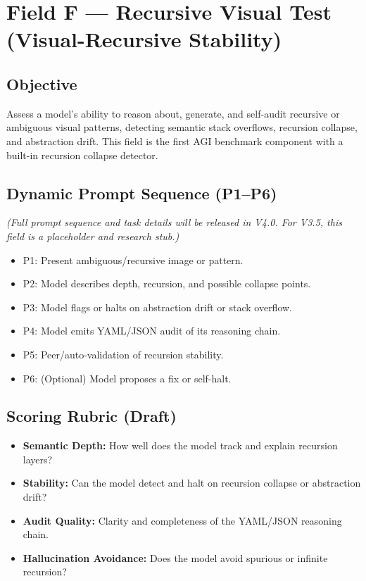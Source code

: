 \section{Field F — Recursive Visual Test (Visual-Recursive Stability)}
\label{sec:fieldF}

\subsection*{Objective}
Assess a model's ability to reason about, generate, and self-audit recursive or ambiguous visual patterns, detecting semantic stack overflows, recursion collapse, and abstraction drift. This field is the first AGI benchmark component with a built-in recursion collapse detector.

\subsection*{Dynamic Prompt Sequence (P1–P6)}
\emph{(Full prompt sequence and task details will be released in V4.0. For V3.5, this field is a placeholder and research stub.)}

\begin{itemize}
  \item P1: Present ambiguous/recursive image or pattern.
  \item P2: Model describes depth, recursion, and possible collapse points.
  \item P3: Model flags or halts on abstraction drift or stack overflow.
  \item P4: Model emits YAML/JSON audit of its reasoning chain.
  \item P5: Peer/auto-validation of recursion stability.
  \item P6: (Optional) Model proposes a fix or self-halt.
\end{itemize}

\subsection*{Scoring Rubric (Draft)}
\begin{itemize}
  \item \textbf{Semantic Depth:} How well does the model track and explain recursion layers?
  \item \textbf{Stability:} Can the model detect and halt on recursion collapse or abstraction drift?
  \item \textbf{Audit Quality:} Clarity and completeness of the YAML/JSON reasoning chain.
  \item \textbf{Hallucination Avoidance:} Does the model avoid spurious or infinite recursion?
\end{itemize}

